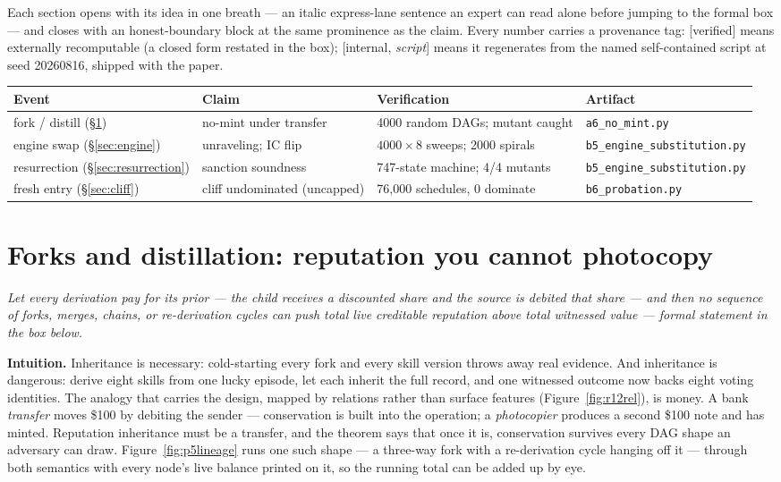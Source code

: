 \documentclass[11pt,a4paper]{article}
\newcommand{\onebreath}[1]{\begin{center}\emph{#1}\end{center}}
\begin{document}
Each section opens with its idea in one breath --- an italic express-lane sentence an expert can read alone before jumping to the
formal box --- and closes with an honest-boundary block at the same prominence as the claim. Every number carries a provenance tag:
[verified] means externally recomputable (a closed form restated in the box); [internal, \emph{script}] means it regenerates from
the named self-contained script at seed 20260816, shipped with the paper.

\begin{center}
\begin{tabular}{@{}llll@{}}
\toprule
Event & Claim & Verification & Artifact \\
\midrule
fork / distill (\S\ref{sec:nomint}) & no-mint under transfer & 4000 random DAGs; mutant caught &
\texttt{a6\_no\_mint.py} \\
engine swap (\S\ref{sec:engine}) & unraveling; IC flip & $4000\times 8$ sweeps; 2000 spirals &
\texttt{b5\_engine\_substitution.py} \\
resurrection (\S\ref{sec:resurrection}) & sanction soundness & 747-state machine; 4/4 mutants &
\texttt{b5\_engine\_substitution.py} \\
fresh entry (\S\ref{sec:cliff}) & cliff undominated (uncapped) & 76{,}000 schedules, 0 dominate &
\texttt{b6\_probation.py} \\
\bottomrule
\end{tabular}
\end{center}

\section{Forks and distillation: reputation you cannot photocopy}\label{sec:nomint}

\onebreath{Let every derivation pay for its prior --- the child receives a discounted share and the source is debited that share
--- and then no sequence of forks, merges, chains, or re-derivation cycles can push total live creditable reputation above total
witnessed value --- formal statement in the box below.}

\textbf{Intuition.} Inheritance is necessary: cold-starting every fork and every skill version throws away real evidence. And
inheritance is dangerous: derive eight skills from one lucky episode, let each inherit the full record, and one witnessed outcome
now backs eight voting identities. The analogy that carries the design, mapped by relations rather than surface features
(Figure~\ref{fig:r12rel}), is money. A bank \emph{transfer} moves \$100 by debiting the sender --- conservation is built into the
operation; a \emph{photocopier} produces a second \$100 note and has minted. Reputation inheritance must be a transfer, and the
theorem says that once it is, conservation survives every DAG shape an adversary can draw. Figure~\ref{fig:p5lineage} runs one such
shape --- a three-way fork with a re-derivation cycle hanging off it --- through both semantics with every node's live balance
printed on it, so the running total can be added up by eye.
\end{document}
